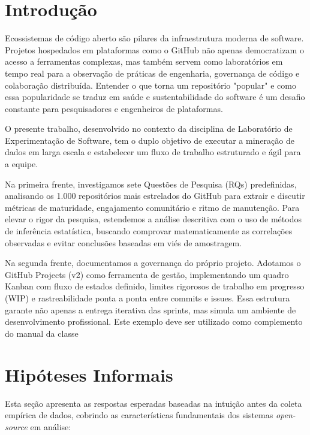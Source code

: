 \documentclass[
	article,			%
	11pt,				%
	oneside,			%
	a4paper,			%
	english,			%
	brazil,				%
	sumario=tradicional
	]{abntex2}
\begin{document}
\section*{Introdução}

Ecossistemas de código aberto são pilares da infraestrutura moderna de software. Projetos hospedados em plataformas como o GitHub não apenas democratizam o acesso a ferramentas complexas, mas também servem como laboratórios em tempo real para a observação de práticas de engenharia, governança de código e colaboração distribuída. Entender o que torna um repositório "popular" e como essa popularidade se traduz em saúde e sustentabilidade do software é um desafio constante para pesquisadores e engenheiros de plataformas.

O presente trabalho, desenvolvido no contexto da disciplina de Laboratório de Experimentação de Software, tem o duplo objetivo de executar a mineração de dados em larga escala e estabelecer um fluxo de trabalho estruturado e ágil para a equipe.

Na primeira frente, investigamos sete Questões de Pesquisa (RQs) predefinidas, analisando os 1.000 repositórios mais estrelados do GitHub para extrair e discutir métricas de maturidade, engajamento comunitário e ritmo de manutenção. Para elevar o rigor da pesquisa, estendemos a análise descritiva com o uso de métodos de inferência estatística, buscando comprovar matematicamente as correlações observadas e evitar conclusões baseadas em viés de amostragem.

Na segunda frente, documentamos a governança do próprio projeto. Adotamos o GitHub Projects (v2) como ferramenta de gestão, implementando um quadro Kanban com fluxo de estados definido, limites rigorosos de trabalho em progresso (WIP) e rastreabilidade ponta a ponta entre commits e issues. Essa estrutura garante não apenas a entrega iterativa das sprints, mas simula um ambiente de desenvolvimento profissional.
Este exemplo deve ser utilizado como complemento do manual da classe

\section{Hipóteses Informais}
\label{sec:hipoteses_informais}

Esta seção apresenta as respostas esperadas baseadas na intuição antes da coleta empírica de dados, cobrindo as características fundamentais dos sistemas \textit{open-source} em análise:
\end{document}
